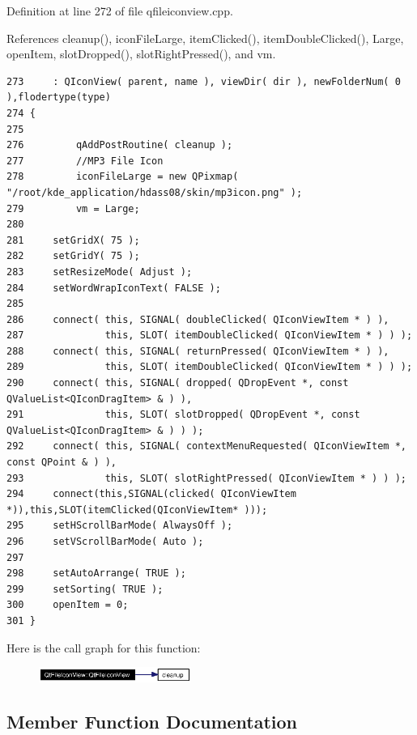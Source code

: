 Definition at line 272 of file qfileiconview.cpp.

References cleanup(), icon\-File\-Large, item\-Clicked(), item\-Double\-Clicked(), Large, open\-Item, slot\-Dropped(), slot\-Right\-Pressed(), and vm.



\footnotesize\begin{verbatim}273     : QIconView( parent, name ), viewDir( dir ), newFolderNum( 0 ),flodertype(type)
274 {
275    
276         qAddPostRoutine( cleanup );
277         //MP3 File Icon
278         iconFileLarge = new QPixmap( "/root/kde_application/hdass08/skin/mp3icon.png" );
279         vm = Large;
280 
281     setGridX( 75 );
282     setGridY( 75 );
283     setResizeMode( Adjust );
284     setWordWrapIconText( FALSE );
285 
286     connect( this, SIGNAL( doubleClicked( QIconViewItem * ) ),
287              this, SLOT( itemDoubleClicked( QIconViewItem * ) ) );
288     connect( this, SIGNAL( returnPressed( QIconViewItem * ) ),
289              this, SLOT( itemDoubleClicked( QIconViewItem * ) ) );
290     connect( this, SIGNAL( dropped( QDropEvent *, const QValueList<QIconDragItem> & ) ),
291              this, SLOT( slotDropped( QDropEvent *, const QValueList<QIconDragItem> & ) ) );
292     connect( this, SIGNAL( contextMenuRequested( QIconViewItem *, const QPoint & ) ),
293              this, SLOT( slotRightPressed( QIconViewItem * ) ) );
294     connect(this,SIGNAL(clicked( QIconViewItem *)),this,SLOT(itemClicked(QIconViewItem* ))); 
295     setHScrollBarMode( AlwaysOff );
296     setVScrollBarMode( Auto );
297 
298     setAutoArrange( TRUE );
299     setSorting( TRUE );
300     openItem = 0;
301 }
\end{verbatim}\normalsize 


Here is the call graph for this function:\begin{figure}[H]
\begin{center}
\leavevmode
\includegraphics[width=141pt]{classQtFileIconView_QtFileIconViewa0_cgraph}
\end{center}
\end{figure}


\subsection{Member Function Documentation}
